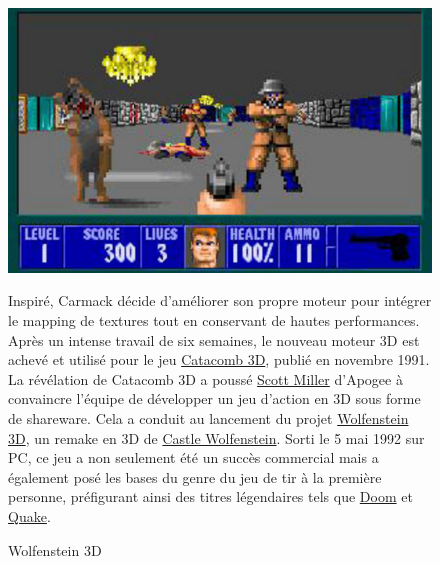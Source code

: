 \documentclass[12pt]{report}
\begin{document}
\begin{figure}[H]
	\begin{minipage}{0.48\textwidth}
		\centering
		\includegraphics[width=\linewidth]{image/wolfenstein_3d.jpg}
		\caption{Wolfenstein 3D}
		\label{fig:wolfenstein3d}
	\end{minipage}\hfill
	\begin{minipage}{0.48\textwidth}
		Inspiré, Carmack décide d'améliorer son propre moteur pour 
		intégrer le mapping de textures tout en conservant de hautes performances. Après un intense travail de six semaines, 
		le nouveau moteur 3D est achevé et utilisé pour le jeu \href{https://fr.wikipedia.org/wiki/Catacomb_3D}{Catacomb 3D},
		publié en novembre 1991. La révélation de Catacomb 3D a poussé 
		\href{https://fr.wikipedia.org/wiki/Scott_Miller_(programmeur)}{Scott Miller} d'Apogee à convaincre l'équipe de 
		développer un jeu d'action en 3D sous forme de shareware. Cela a conduit au lancement du projet 
		\href{https://fr.wikipedia.org/wiki/Wolfenstein_3D}{Wolfenstein 3D}, un remake en 3D de 
		\href{https://fr.wikipedia.org/wiki/Castle_Wolfenstein}{Castle Wolfenstein}. Sorti le 5 mai 1992 sur PC, ce jeu a 
		non seulement été un succès commercial mais a également posé les bases du genre du jeu de tir à la première personne, 
		préfigurant ainsi des titres légendaires tels que 
		\href{https://fr.wikipedia.org/wiki/Doom_(jeu_vid%C3%A9o,_1993)}{Doom} et 
		\href{https://fr.wikipedia.org/wiki/Quake}{Quake}.
	\end{minipage}
\end{figure}

\end{document}
